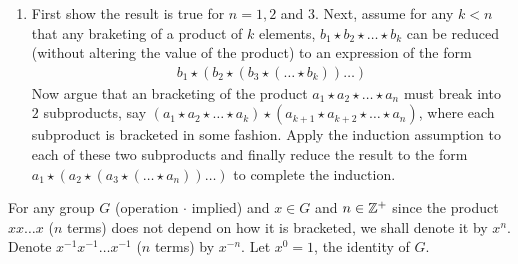 {\begin{enumerate}[leftmargin=20pt, itemsep=0pt, topsep=0pt]
\begin{align*}
        b\star c &= a^{-1}
    \end{align*}
    Now, multiply both sides on the left by $b^{-1}$ to get
    \begin{align*}
        b^{-1}\star(b\star c) &= b^{-1}\star a^{-1}\\
        (b^{-1}\star b)\star c &= b^{-1}\star a^{-1}\\
        e\star c &= b^{-1}\star a^{-1}\\
        c &= b^{-1}\star a^{-1}
    \end{align*}
    Thus $(a\star b)^{-1} = b^{-1}\star a^{-1}$.
    \item First show the result is true for $n=1,2$ and $3$.
    Next, assume for any $k<n$ that any braketing of a product of $k$ elements,
    $b_{1}\star b_{2}\star \dots\star b_{k}$ can be reduced (without altering the value of the product)
    to an expression of the form
    \begin{align*}
        b_{1}\star(b_{2}\star (b_{3}\star (\dots \star b_{k}))\dots)
    \end{align*}
    Now argue that an bracketing of the product $a_{1}\star a_{2}\star\dots\star a_{n}$ must break into $2$
    subproducts, say $(a_{1}\star a_{2}\star\dots\star a_{k})\star (a_{k+1}\star a_{k+2}\star\dots\star a_{n})$,
    where each subproduct is bracketed in some fashion.
    Apply the induction assumption to each of these two subproducts and finally reduce the result to the form
    $a_{1}\star(a_{2}\star (a_{3}\star (\dots\star a_{n}))\dots)$ to complete the induction.
\end{enumerate}}
\newpage
\thispagestyle{oddpagestyle}
For any group $G$ (operation $\cdot$ implied)
and $x\in G$ and $n\in\mathbb{Z}^{+}$ since the product $xx\dots x$ ($n$ terms)
does not depend on how it is bracketed, we shall denote it by $x^{n}$.
Denote $x^{-1}x^{-1}\dots x^{-1}$ ($n$ terms) by $x^{-n}$. Let $x^{0} = 1$, the identity of $G$.

